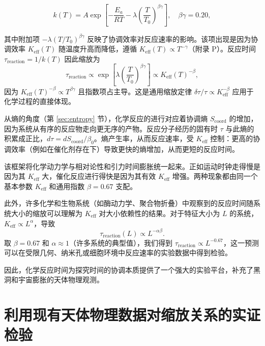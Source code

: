 \documentclass[12pt,a4paper]{article}
\newcommand{\Keff}{K_{\mathrm{eff}}}
\newcommand{\Scoord}{S_{\mathrm{coord}}}
\begin{document}
	\begin{equation}
		k(T) = A \exp\left[-\frac{E_a}{RT} - \lambda \left(\frac{T}{T_0}\right)^{\beta\gamma}\right], \quad \beta\gamma = 0.20,
	\end{equation}
	
	其中附加项 \(-\lambda (T/T_0)^{\beta\gamma}\) 反映了协调效率对反应速率的影响。该项出现是因为协调效率 \(\Keff(T)\) 随温度升高而降低，遵循 \(\Keff(T) \propto T^{-\gamma}\)（附录 P）。反应时间 \(\tau_{\mathrm{reaction}} = 1/k(T)\) 因此缩放为
	\begin{equation}
		\tau_{\mathrm{reaction}} \propto \exp\left[\lambda \left(\frac{T}{T_0}\right)^{\beta\gamma}\right] \propto \Keff(T)^{-\beta},
	\end{equation}
	因为 \(\Keff(T)^{-\beta} \propto T^{\beta\gamma}\) 且指数项占主导。这是通用缩放定律 \(\delta \tau / \tau \propto \Keff^{-\beta}\) 应用于化学过程的直接体现。
	
	从熵的角度（第 \ref{sec:entropy} 节），化学反应的进行对应着协调熵 \(\Scoord\) 的增加，因为系统从有序的反应物走向更无序的产物。反应分子经历的固有时 \(\tau\) 与此熵的积累成正比，\(d\tau = d\Scoord / \beta_0\)。熵产生率，从而反应速率，受 \(\Keff\) 控制：更高的协调效率（例如在催化剂存在下）导致更快的熵增加，从而更短的反应时间。
	
	该框架将化学动力学与相对论性和引力时间膨胀统一起来。正如运动时钟走得慢是因为其 \(\Keff\) 大，催化反应进行得快是因为其有效 \(\Keff\) 增强。两种现象都由同一个基本参数 \(\Keff\) 和通用指数 \(\beta = 0.67\) 支配。
	
	此外，许多化学和生物系统（如酶动力学、聚合物折叠）中观察到的反应时间随系统大小的缩放可以理解为 \(\Keff\) 对大小依赖性的结果。对于特征大小为 \(L\) 的系统，\(\Keff \propto L^{\alpha}\)，导致
	\begin{equation}
		\tau_{\mathrm{reaction}}(L) \propto L^{-\alpha\beta}.
	\end{equation}
	取 \(\beta = 0.67\) 和 \(\alpha \approx 1\)（许多系统的典型值），我们得到 \(\tau_{\mathrm{reaction}} \propto L^{-0.67}\)，这一预测可以在受限几何、纳米孔或细胞环境中反应速率的实验数据中得到检验。
	
	因此，化学反应时间为探究时间的协调本质提供了一个强大的实验平台，补充了黑洞和宇宙膨胀的天体物理观测。
	
	\section{利用现有天体物理数据对缩放关系的实证检验}
	\label{sec:empirical_test}
	
\end{document}
